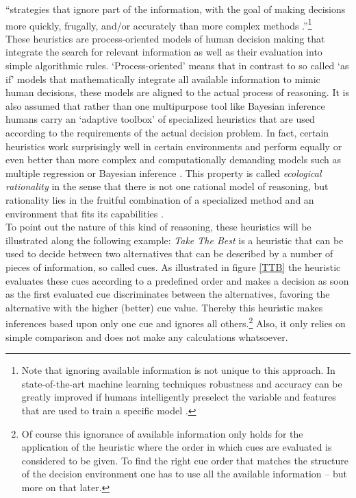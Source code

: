 ``strategies that ignore part of the information, with the goal of making decisions more quickly, frugally, and/or accurately than more complex methods \citep{Gigerenzer2011}.''\footnote{Note that ignoring available information is not unique to this approach. In state-of-the-art machine learning techniques robustness and accuracy can be greatly improved if humans intelligently preselect the variable and features that are used to train a specific model \citep{Guyon2003}.} \\

These heuristics are process-oriented models of human decision making that integrate the search for relevant information as well as their evaluation into simple algorithmic rules. `Process-oriented' means that in contrast to so called `as if' models that mathematically integrate all available information to mimic human decisions, these models are aligned to the actual process of reasoning. It is also assumed that rather than one multipurpose tool like Bayesian inference humans carry an `adaptive toolbox' of specialized heuristics \citep{gigerenzer2002bounded} that are used according to the requirements of the actual decision problem.
In fact, certain heuristics work surprisingly well in certain environments and perform equally or even better than more complex and computationally demanding models such as multiple regression or Bayesian inference \citep{Gigerenzer2009}. This property is called \emph{ecological rationality} in the sense that there is not one rational model of reasoning, but rationality lies in the fruitful combination of a specialized method and an environment that fits its capabilities \citep{todd2007environments}.\\
To point out the nature of this kind of reasoning, these heuristics will be illustrated along the following example: \emph{Take The Best} \citep{Gigerenzer1996} is a heuristic that can be used to decide between two alternatives that can be described by a number of pieces of information, so called cues. As illustrated in figure \ref{TTB} the heuristic evaluates these cues according to a predefined order and makes a decision as soon as the first evaluated cue discriminates between the alternatives, favoring the alternative with the higher (better) cue value. Thereby this heuristic makes inferences based upon only one cue and ignores all others.\footnote{Of course this ignorance of available information only holds for the application of the heuristic where the order in which cues are evaluated is considered to be given. To find the right cue order that matches the structure of the decision environment one has to use all the available information -- but more on that later.} Also, it only relies on simple comparison and does not make any calculations whatsoever.\\
